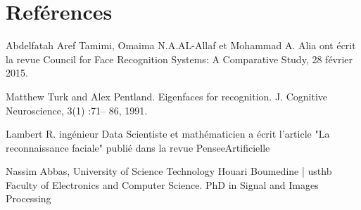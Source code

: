 \documentclass[12pt, letterpaper]{article}
\begin{document}
\section{Reférences}
\par [1] Abdelfatah Aref Tamimi, Omaima N.A.AL-Allaf et Mohammad A. Alia ont écrit la revue Council for Face Recognition Systems: A Comparative Study, 28 février 2015.

\par [2] Matthew Turk and Alex Pentland. Eigenfaces for recognition. J. Cognitive Neuroscience, 3(1) :71– 86, 1991.
\par [3] Lambert R. ingénieur Data Scientiste et mathématicien a écrit l'article "La reconnaissance faciale" publié dans la revue PenseeArtificielle
\par [4] Nassim Abbas, University of Science Technology Houari Boumedine | usthb Faculty of Electronics and Computer Science. PhD in Signal and Images Processing


\newpage
\printbibliography
\end{document}
